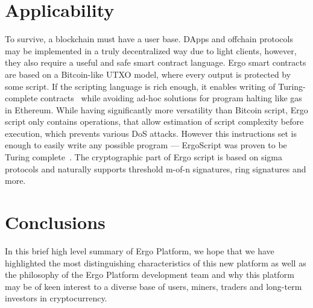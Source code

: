 \documentclass[]{article}
\begin{document}
    \section{Applicability}

    To survive, a blockchain must have a user base. DApps and offchain protocols may be
    implemented in a truly decentralized way due to light clients, however, they also require a useful
    and safe smart contract language. Ergo smart contracts are based on a Bitcoin-like UTXO
    model, where every output is protected by some script. If the scripting language is rich enough,
    it enables writing of Turing-complete contracts~\cite{chepurnoy2018self} while avoiding ad-hoc solutions for
    program halting like gas in Ethereum. While having significantly more versatility than Bitcoin
    script, Ergo script only contains operations, that allow estimation of script complexity before
    execution, which prevents various DoS attacks. However this instructions set is enough to
    easily write any possible program --- ErgoScript was proven to be Turing complete~\cite{chepurnoy2018self}. The
    cryptographic part of Ergo script is based on sigma protocols and naturally supports threshold
    m-of-n signatures, ring signatures and more.

    \section{Conclusions}

    In this brief high level summary of Ergo Platform, we hope that we have highlighted the most
    distinguishing characteristics of this new platform as well as the philosophy of the Ergo Platform
    development team and why this platform may be of keen interest to a diverse base of users,
    miners, traders and long-term investors in cryptocurrency.

    
\end{document}
